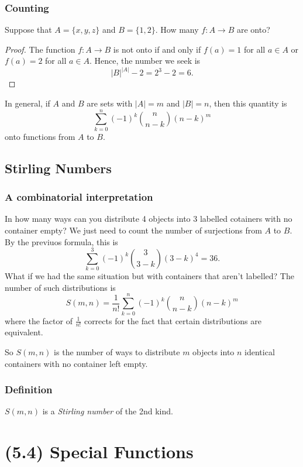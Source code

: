\documentclass[11pt]{article}
\begin{document}
    \subsubsection{Counting}

    Suppose that \(A = \{x,y,z\}\) and \(B = \{1,2\}\). How many \(f: A \rightarrow B\) are onto? 
    \begin{proof}
        The function \(f: A \rightarrow B\) is not onto if and only if \(f(a) = 1\) for all \(a \in A\) or \(f(a)=2\) for all \(a \in A\). Hence, the number we seek is \[|B|^{|A|} - 2 = 2^3 - 2 = 6.\]
    \end{proof}
    In general, if $A$ and $B$ are sets with \(|A| = m\) and \(|B| = n\), then this quantity is \[ \sum_{k = 0}^{n} (-1)^k \binom{n}{n - k} (n-k)^m \] onto functions from $A$ to $B$.

    \subsection{Stirling Numbers}

    \subsubsection{A combinatorial interpretation}

    In how many ways can you distribute 4 objects into 3 labelled cotainers with no container empty?
    We just need to count the number of surjections from $A$ to $B$. By the previuos formula, this is \[\sum_{k = 0}^{3} (-1)^k \binom{3}{3-k} (3-k)^4 = 36.\] What if we had the same situation but with containers that aren't labelled? The number of such distributions is \[S(m,n) = \frac{1}{n!} \sum_{k=0}^n (-1)^k \binom{n}{n-k} (n-k)^m\] where the factor of \(\frac{1}{n!}\) corrects for the fact that certain distributions are equivalent.

    So \(S(m,n)\) is the number of ways to distribute $m$ objects into $n$ identical containers with no container left empty. 

    \subsubsection{Definition}

    \(S(m,n)\) is a \emph{Stirling number} of the 2nd kind.
    
    \section{(5.4) Special Functions}
\end{document}
